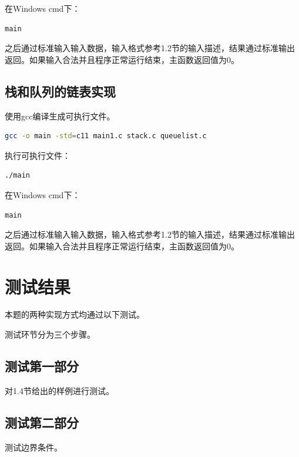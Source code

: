\documentclass{article}
\begin{document}
在Windows cmd下：

\begin{lstlisting}[language={bash},
    basicstyle=\small\consolas]
main
\end{lstlisting}

之后通过标准输入输入数据，输入格式参考1.2节的输入描述，结果通过标准输出返回。如果输入合法并且程序正常运行结束，主函数返回值为0。

\subsection{栈和队列的链表实现}

使用gcc编译生成可执行文件。

\begin{lstlisting}[language={bash},
    basicstyle=\small\consolas]
gcc -o main -std=c11 main1.c stack.c queuelist.c
\end{lstlisting}

执行可执行文件：

\begin{lstlisting}[language={bash},
    basicstyle=\small\consolas]
./main
\end{lstlisting}

在Windows cmd下：

\begin{lstlisting}[language={bash},
    basicstyle=\small\consolas]
main
\end{lstlisting}

之后通过标准输入输入数据，输入格式参考1.2节的输入描述，结果通过标准输出返回。如果输入合法并且程序正常运行结束，主函数返回值为0。

\section{测试结果}

本题的两种实现方式均通过以下测试。

测试环节分为三个步骤。

\subsection{测试第一部分}

对1.4节给出的样例进行测试。

\subsection{测试第二部分}

测试边界条件。
\end{document}
